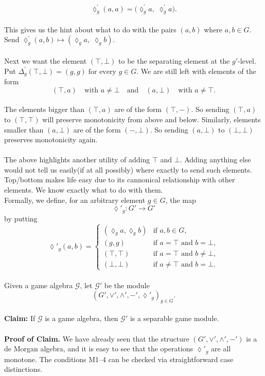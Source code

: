 \documentclass[12pt]{article}
\begin{document}
\[
\lozenge^{'}_g(a,a) = \bigl(\lozenge^{'}_g a, \; \lozenge^{'}_g a \bigr).
\]\\
This gives us the hint about what to do with the pairs $(a,b)$ where $a,b \in G$.
Send $\lozenge^{'}_g(a,b) \mapsto (\lozenge_g a, \; \lozenge_g b).$\\ \\
Next we want the element $(\top,\bot)$ to be the separating element at the $g'$-level. Put $\Delta^{'}_g(\top,\bot) = (g,g) \; \text{for every } g \in G.$
We are still left with elements of the form 
\[
(\top, a) \quad \text{with } a \neq \bot \quad \text{and} \quad (a,\bot) \quad \text{with } a \neq \top.
\]\\
The elements bigger than $(\top, a)$ are of the form $(\top, -)$. So sending $(\top,a)$ to $(\top, \top)$ will preserve monotonicity from above and below. 
Similarly, elements smaller than $(a,\bot)$ are of the form $(-,\bot)$. So sending $(a,\bot)$ to $(\bot,\bot)$ preserves monotonicity again. \\ \\
The above highlights another utility of adding $\top$ and $\bot$. Adding anything else would not tell us easily(if at all possibly) where exactly to send such elements. Top/bottom makes life easy due to its cannonical relationship with other elements. We know exactly what to do with them. \\ 
Formally, we define, for an arbitrary element $g \in G$, the map 
\[
\lozenge'_g : G' \to G'
\]
by putting
\[
\lozenge'_g(a,b) =
\begin{cases}
(\lozenge_g a, \lozenge_g b) & \text{if } a,b \in G, \\[6pt]
(g,g) & \text{if } a = \top \text{ and } b = \bot, \\[6pt]
(\top, \top) & \text{if } a = \top \text{ and } b \neq \bot, \\[6pt]
(\bot, \bot) & \text{if } a \neq \top \text{ and } b = \bot.
\end{cases}
\]\\
Given a game algebra $\mathcal{G}$, let $\mathcal{G}'$ be the module 
\[
(G', \vee', \wedge', -', \lozenge'_g)_{g \in G}.
\]\\
\textbf{Claim:} If $\mathcal{G}$ is a game algebra, then $\mathcal{G}'$ is a separable game module. \\ \\
\textbf{Proof of Claim.} We have already seen that the structure 
$(G', \vee', \wedge', -')$ is a de Morgan algebra, and it is easy to see that the operations 
$\lozenge'_g$ are all monotone. The conditions M1--4 can be checked via straightforward case distinctions. \\
\end{document}
